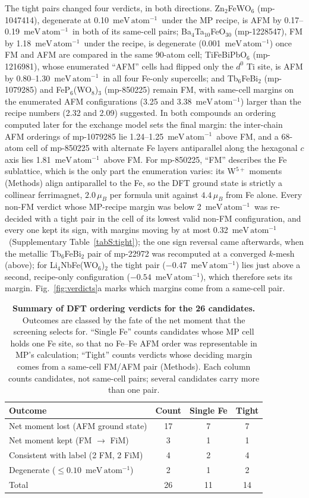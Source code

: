 \documentclass[aps,prb,preprint,superscriptaddress,longbibliography,nofootinbib]{revtex4-2}
\newcommand{\meVat}{\ensuremath{\mathrm{meV\,atom^{-1}}}}
\begin{document}
The tight pairs changed four verdicts, in both directions.
Zn$_2$FeWO$_6$ (mp-1047414), degenerate at
0.10~\meVat\ under the MP recipe, is AFM by 0.17--0.19~\meVat\ in both of its same-cell pairs;
Ba$_4$Ta$_{10}$FeO$_{30}$ (mp-1228547), FM by 1.18~\meVat\ under the recipe, is
degenerate (0.001~\meVat) once FM and AFM are compared in the same 90-atom cell; TiFeBiPbO$_6$ (mp-1216981),
whose enumerated ``AFM'' cells had flipped only the $d^0$ Ti site, is AFM by 0.80--1.30~\meVat\ in all four
Fe-only supercells; and Tb$_6$FeBi$_2$ (mp-1079285) and FeP$_6$(WO$_8$)$_3$ (mp-850225) remain FM, with
same-cell margins on the enumerated AFM configurations (3.25 and 3.38~\meVat) larger than the recipe numbers
(2.32 and 2.09) suggested. In both compounds an ordering computed later for the exchange model sets the
final margin: the inter-chain AFM orderings of mp-1079285 lie 1.24--1.25~\meVat\ above FM, and a 68-atom cell
of mp-850225 with alternate Fe layers antiparallel along the hexagonal $c$ axis lies 1.81~\meVat\ above FM.
For mp-850225, ``FM'' describes the Fe sublattice, which is the only part the enumeration varies: its
W$^{5+}$ moments (Methods) align antiparallel to the Fe, so the DFT ground state is strictly a collinear
ferrimagnet, $2.0\,\mu_B$ per formula unit against $4.4\,\mu_B$ from Fe alone. Every non-FM verdict whose MP-recipe
margin was below 2~\meVat\ was re-decided with a tight pair in the cell of its lowest valid non-FM
configuration, and every one kept its sign, with margins moving by at most 0.32~\meVat\ (Supplementary
Table~\ref{tabS:tight}); the one sign reversal came afterwards, when the metallic Tb$_6$FeBi$_2$ pair of
mp-22972 was recomputed at a converged $k$-mesh (above); for Li$_4$NbFe(WO$_6$)$_2$ the tight pair ($-0.47$~\meVat) lies just above a second,
recipe-only configuration ($-0.54$~\meVat), which therefore sets its margin. Fig.~\ref{fig:verdicts}a marks
which margins come from a same-cell pair.

\begin{table}[t]
\centering
\caption{\textbf{Summary of DFT ordering verdicts for the 26 candidates.} Outcomes are classed by the
fate of the net moment that the screening selects for. ``Single Fe'' counts candidates whose MP cell holds one Fe
site, so that no Fe--Fe AFM order was representable in MP's calculation; ``Tight'' counts verdicts whose
deciding margin comes from a same-cell FM/AFM pair (Methods). Each column counts candidates, not same-cell
pairs; several candidates carry more than one pair.}
\label{tab:summary}
\begin{tabular}{lccc}
\toprule
Outcome & Count & Single Fe & Tight \\
\midrule
Net moment lost (AFM ground state) & 17 & 7 & 7 \\
Net moment kept (FM $\to$ FiM) & 3 & 1 & 1 \\
Consistent with label (2 FM, 2 FiM) & 4 & 2 & 4 \\
Degenerate ($\le 0.10$~\meVat) & 2 & 1 & 2 \\
\midrule
Total & 26 & 11 & 14 \\
\bottomrule
\end{tabular}
\end{table}
\end{document}
